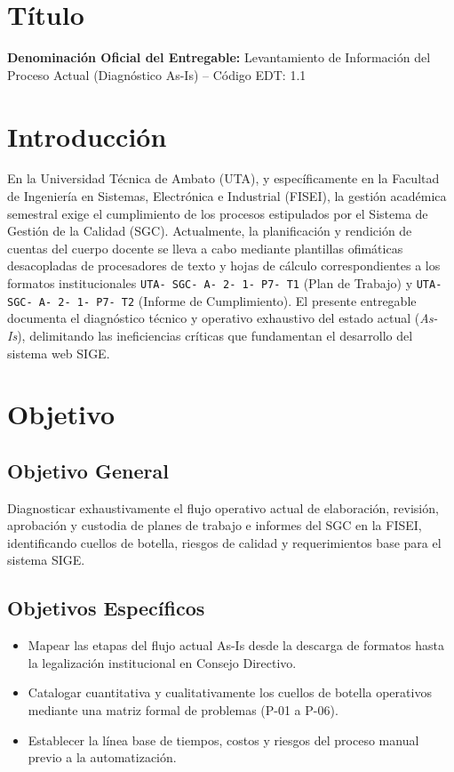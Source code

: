 \documentclass[12pt,a4paper]{article}
\begin{document}
\section{Título}
\textbf{Denominación Oficial del Entregable:} Levantamiento de Información del Proceso Actual (Diagnóstico As-Is) -- Código EDT: 1.1

\section{Introducción}
En la Universidad Técnica de Ambato (UTA), y específicamente en la Facultad de Ingeniería en Sistemas, Electrónica e Industrial (FISEI), la gestión académica semestral exige el cumplimiento de los procesos estipulados por el Sistema de Gestión de la Calidad (SGC). Actualmente, la planificación y rendición de cuentas del cuerpo docente se lleva a cabo mediante plantillas ofimáticas desacopladas de procesadores de texto y hojas de cálculo correspondientes a los formatos institucionales \texttt{UTA- SGC- A- 2- 1- P7- T1} (Plan de Trabajo) y \texttt{UTA- SGC- A- 2- 1- P7- T2} (Informe de Cumplimiento). El presente entregable documenta el diagnóstico técnico y operativo exhaustivo del estado actual (\textit{As-Is}), delimitando las ineficiencias críticas que fundamentan el desarrollo del sistema web SIGE.

\section{Objetivo}
\subsection{Objetivo General}
Diagnosticar exhaustivamente el flujo operativo actual de elaboración, revisión, aprobación y custodia de planes de trabajo e informes del SGC en la FISEI, identificando cuellos de botella, riesgos de calidad y requerimientos base para el sistema SIGE.
\subsection{Objetivos Específicos}
\begin{itemize}[leftmargin=1.5em, itemsep=2pt]
    \item Mapear las etapas del flujo actual As-Is desde la descarga de formatos hasta la legalización institucional en Consejo Directivo.
    \item Catalogar cuantitativa y cualitativamente los cuellos de botella operativos mediante una matriz formal de problemas (P-01 a P-06).
    \item Establecer la línea base de tiempos, costos y riesgos del proceso manual previo a la automatización.
\end{itemize}
\end{document}
